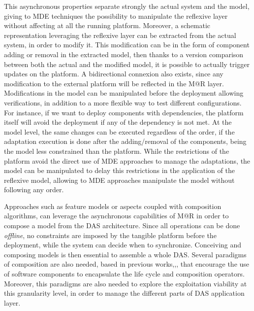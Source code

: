 This asynchronous properties separate strongly the actual system and the model, giving to MDE techniques the possibility to manipulate the reflexive layer without affecting at all the running platform.
Moreover, a schematic representation leveraging the reflexive layer can be extracted from the actual system, in order to modify it.
This modification can be in the form of component adding or removal in the extracted model, then thanks to a version comparison between both the actual and the modified model, it is possible to actually trigger updates on the platform.
A bidirectional connexion also exists, since any modification to the external platform will be reflected in the M@R layer.
Modifications in the model can be manipulated before the deployment allowing verifications, in addition to a more flexible way to test different configurations.
For instance, if we want to deploy components with dependencies, the platform itself will avoid the deployment if any of the dependency is not met.
At the model level, the same changes can be executed regardless of the order, if the adaptation execution is done after the adding/removal of the components, being the model less constrained than the platform.
While the restrictions of the platform avoid the direct use of MDE approaches to manage the adaptations, the model can be manipulated to delay this restrictions in the application of the reflexive model, allowing to MDE approaches manipulate the model without following any order.

Approaches such as feature models or aspects\cite{morin2009taming} coupled with composition algorithms, can leverage the asynchronous capabilities of M@R in order to compose a model from the DAS architecture.
Since all operations can be done \textit{offline}, no constraints are imposed by the tangible platform before the deployment, while the system can decide when to synchronize.
Conceiving and composing models is then essential to assemble a whole DAS.
Several paradigms of composition are also needed, based in previous works\cite{morin2009mar},\cite{ko2012low},\cite{rouvoy2009music}, that encourage the use of software components to encapsulate the life cycle and composition operators.
Moreover, this paradigms are also needed to explore the exploitation viability at this granularity level, in order to manage the different parts of DAS application layer. 

